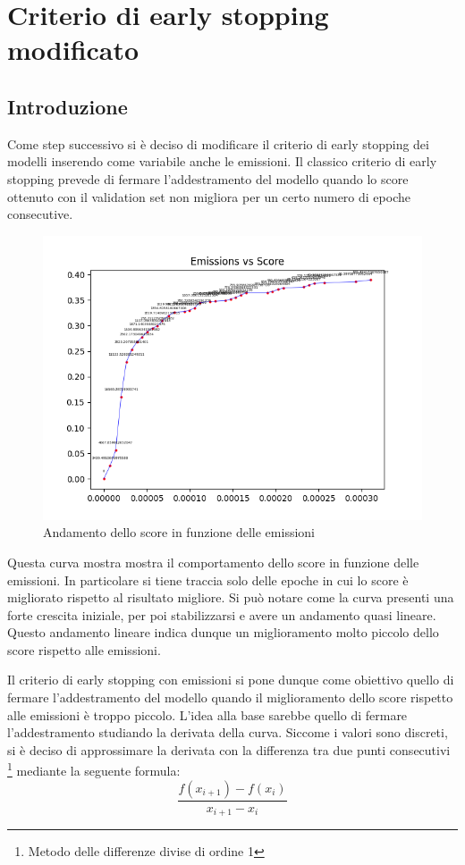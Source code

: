 \section{Criterio di early stopping modificato}
\subsection{Introduzione}
Come step successivo si è deciso di modificare il criterio di early stopping dei modelli inserendo come variabile anche le emissioni.
Il classico criterio di early stopping prevede di fermare l'addestramento del modello quando lo score ottenuto con il validation set non migliora per un certo numero di epoche consecutive.


\begin{figure}[H]
    \centering
    \includegraphics[scale=1]{images/curve_emissions_score.png}
    \caption{Andamento dello score in funzione delle emissioni}
\end{figure}

\noindent Questa curva mostra mostra il comportamento dello score in funzione delle emissioni. In particolare si tiene traccia solo delle epoche in cui lo score è migliorato rispetto al risultato migliore.
Si può notare come la curva presenti una forte crescita iniziale, per poi stabilizzarsi e avere un andamento quasi lineare.
Questo andamento lineare indica dunque un miglioramento molto piccolo dello score rispetto alle emissioni.

\noindent Il criterio di early stopping con emissioni si pone dunque come obiettivo quello di fermare l'addestramento del modello quando il miglioramento dello score rispetto alle emissioni è troppo piccolo.
L'idea alla base sarebbe quello di fermare l'addestramento studiando la derivata della curva. Siccome i valori sono discreti, si è deciso di approssimare la derivata con la differenza tra due punti consecutivi \footnote{Metodo delle differenze divise di ordine 1}{} mediante la seguente formula:
\begin{equation}
    \frac{f(x_{i+1}) - f(x_i)}{x_{i+1} - x_i}
\end{equation}

